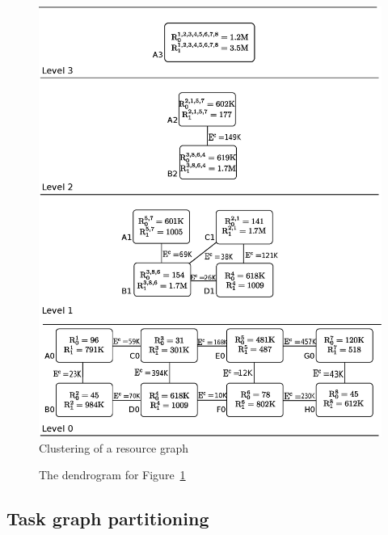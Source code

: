 \begin{figure}[ht]
  \includegraphics[scale=0.43]{./figures/resource}
  \caption{Clustering of a resource graph}
  \label{fig:res}
\end{figure}

\begin{figure}[ht!]
  \centering
  \scalebox{0.4}{}
  \caption{The dendrogram for Figure~\ref{fig:res}}
  \label{fig:7}
\end{figure}


\subsection{Task graph partitioning}
\label{sec:task-graph-part}

